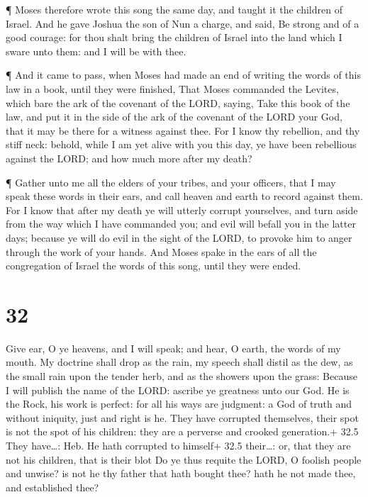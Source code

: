  ¶ Moses therefore wrote this song the same day, and taught
it the children of Israel.  And he gave Joshua the son of
Nun a charge, and said, Be strong and of a good courage: for thou shalt
bring the children of Israel into the land which I sware unto them: and
I will be with thee.

 ¶ And it came to pass, when Moses had made an end of
writing the words of this law in a book, until they were finished,
 That Moses commanded the Levites, which bare the ark of
the covenant of the LORD, saying,  Take this book of the
law, and put it in the side of the ark of the covenant of the LORD your
God, that it may be there for a witness against thee.  For
I know thy rebellion, and thy stiff neck: behold, while I am yet alive
with you this day, ye have been rebellious against the LORD; and how
much more after my death?

 ¶ Gather unto me all the elders of your tribes, and your
officers, that I may speak these words in their ears, and call heaven
and earth to record against them.  For I know that after my
death ye will utterly corrupt yourselves, and turn aside from the way
which I have commanded you; and evil will befall you in the latter days;
because ye will do evil in the sight of the LORD, to provoke him to
anger through the work of your hands.  And Moses spake in
the ears of all the congregation of Israel the words of this song, until
they were ended.

\hypertarget{section-31}{%
\section{32}\label{section-31}}

 Give ear, O ye heavens, and I will speak; and hear, O
earth, the words of my mouth.  My doctrine shall drop as the
rain, my speech shall distil as the dew, as the small rain upon the
tender herb, and as the showers upon the grass:  Because I
will publish the name of the LORD: ascribe ye greatness unto our God.
 He is the Rock, his work is perfect: for all his ways are
judgment: a God of truth and without iniquity, just and right is he.
 They have corrupted themselves, their spot is not the spot
of his children: they are a perverse and crooked generation.+ 32.5 They
have\ldots: Heb. He hath corrupted to himself+ 32.5 their\ldots: or,
that they are not his children, that is their blot  Do ye
thus requite the LORD, O foolish people and unwise? is not he thy father
that hath bought thee? hath he not made thee, and established thee?

